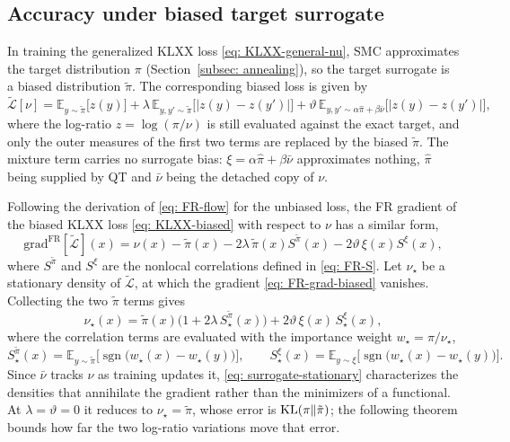 \documentclass{article}
\begin{document}
\subsection{Accuracy under biased target surrogate}

In training the generalized KLXX loss \eqref{eq: KLXX-general-nu}, SMC approximates the target distribution $\pi$ (Section~\ref{subsec: annealing}), so the target surrogate is a biased distribution $\tilde\pi$. The corresponding biased loss is given by
\begin{equation}
	\tilde{\mathcal L}[\nu] = \mathbb E_{y\sim\tilde\pi}\big[z(y)\big] +  \lambda\, \mathbb E_{y,y'\sim\tilde\pi}\big[|z(y)-z(y')|\big] + \vartheta\, \mathbb E_{y,y'\sim \alpha\hat\pi+\beta\bar\nu}\big[|z(y)-z(y')|\big],
	\label{eq: KLXX-biased}
\end{equation}
where the log-ratio $z=\log(\pi/\nu)$ is still evaluated against the exact target, and only the outer measures of the first two terms are replaced  by the biased $\tilde\pi$. The mixture term carries no surrogate bias: $\xi=\alpha\hat\pi+\beta\bar\nu$ approximates nothing, $\hat\pi$ being supplied by QT and $\bar\nu$ being the detached copy of $\nu$.

Following the derivation of \eqref{eq: FR-flow} for the unbiased loss, the FR gradient of the biased KLXX loss \eqref{eq: KLXX-biased} with respect to $\nu$ has a similar form,
\begin{equation}
	\mathrm{grad}^{\mathrm{FR}}[\tilde{\mathcal L}](x) = \nu(x)-\tilde\pi(x) - 2\lambda\,\tilde\pi(x)S^{\tilde\pi}(x) - 2\vartheta\,\xi(x)S^{\xi}(x),
	\label{eq: FR-grad-biased}
\end{equation}
where $S^{\tilde\pi}$ and $S^{\xi}$ are the nonlocal correlations defined in \eqref{eq: FR-S}.
Let $\nu_\star$ be a stationary density of $\tilde {\mathcal L}$, at which the gradient \eqref{eq: FR-grad-biased} vanishes. Collecting the two $\tilde\pi$ terms gives
\begin{equation}
	\nu_\star(x) = \tilde\pi(x)\bigl(1 + 2\lambda\,S^{\tilde\pi}_\star(x)\bigr) + 2\vartheta\,\xi(x)\,S^{\xi}_\star(x),
	\label{eq: surrogate-stationary}
\end{equation}
where the correlation terms are evaluated with the importance weight $w_\star=\pi/\nu_\star$,
\begin{equation}
	S^{\tilde\pi}_\star(x) = \mathbb E_{y\sim\tilde\pi}\bigl[\operatorname{sgn}\bigl(w_\star(x)-w_\star(y)\bigr)\bigr],
	\qquad
	S^{\xi}_\star(x) = \mathbb E_{y\sim\xi}\bigl[\operatorname{sgn}\bigl(w_\star(x)-w_\star(y)\bigr)\bigr].
\end{equation}
Since $\bar\nu$ tracks $\nu$ as training updates it, \eqref{eq: surrogate-stationary} characterizes the densities that annihilate the gradient rather than the minimizers of a functional. At $\lambda=\vartheta=0$ it reduces to $\nu_\star=\tilde\pi$, whose error is $\mathrm{KL}(\pi\|\tilde\pi)$; the following theorem bounds how far the two log-ratio variations move that error.
\end{document}
